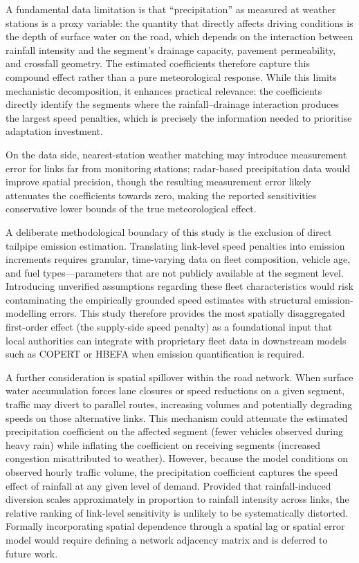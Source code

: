 \documentclass[review,authoryear]{elsarticle}
\begin{document}
A fundamental data limitation is that ``precipitation'' as measured at weather stations is a proxy variable: the quantity that directly affects driving conditions is the depth of surface water on the road, which depends on the interaction between rainfall intensity and the segment's drainage capacity, pavement permeability, and crossfall geometry. The estimated coefficients therefore capture this compound effect rather than a pure meteorological response. While this limits mechanistic decomposition, it enhances practical relevance: the coefficients directly identify the segments where the rainfall--drainage interaction produces the largest speed penalties, which is precisely the information needed to prioritise adaptation investment.

On the data side, nearest-station weather matching may introduce measurement error for links far from monitoring stations; radar-based precipitation data would improve spatial precision, though the resulting measurement error likely attenuates the coefficients towards zero, making the reported sensitivities conservative lower bounds of the true meteorological effect.

A deliberate methodological boundary of this study is the exclusion of direct tailpipe emission estimation. Translating link-level speed penalties into emission increments requires granular, time-varying data on fleet composition, vehicle age, and fuel types---parameters that are not publicly available at the segment level. Introducing unverified assumptions regarding these fleet characteristics would risk contaminating the empirically grounded speed estimates with structural emission-modelling errors. This study therefore provides the most spatially disaggregated first-order effect (the supply-side speed penalty) as a foundational input that local authorities can integrate with proprietary fleet data in downstream models such as COPERT or HBEFA when emission quantification is required.

A further consideration is spatial spillover within the road network. When surface water accumulation forces lane closures or speed reductions on a given segment, traffic may divert to parallel routes, increasing volumes and potentially degrading speeds on those alternative links. This mechanism could attenuate the estimated precipitation coefficient on the affected segment (fewer vehicles observed during heavy rain) while inflating the coefficient on receiving segments (increased congestion misattributed to weather). However, because the model conditions on observed hourly traffic volume, the precipitation coefficient captures the speed effect of rainfall at any given level of demand. Provided that rainfall-induced diversion scales approximately in proportion to rainfall intensity across links, the relative ranking of link-level sensitivity is unlikely to be systematically distorted. Formally incorporating spatial dependence through a spatial lag or spatial error model would require defining a network adjacency matrix and is deferred to future work.
\end{document}
